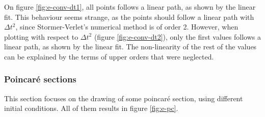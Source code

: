 \documentclass[a4paper,12pt,twoside]{article}
\begin{document}
On figure \ref{fig:e-conv-dt1}, all points follows a linear path, as shown by the linear fit.
This behaviour seems strange, as the points should follow a linear path with $\Delta t^2$, since Stormer-Verlet's numerical method is of order 2.
However, when plotting with respect to $\Delta t^2$ (figure \ref{fig:e-conv-dt2}), only the first values follows a linear path, as shown by the linear fit.
The non-linearity of the rest of the values can be explained by the terms of upper orders that were neglected. %

\subsubsection{Poincaré sections}
This section focuses on the drawing of some poincaré section, using different initial conditions.
All of them results in figure \ref{fig:e-pc}.
\end{document}
